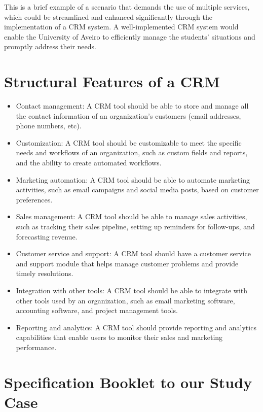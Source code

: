 \documentclass{article}
\begin{document}
This is a brief example of a scenario that demands the use of multiple services, which could be streamlined and enhanced significantly through the implementation of a CRM system. A well-implemented CRM system would enable the University of Aveiro to efficiently manage the students' situations and promptly address their needs.


\section{Structural Features of a CRM}

\begin{itemize}
    \item Contact management: A CRM tool should be able to store and manage all the contact information of an organization's customers (email addresses, phone numbers, etc).

    \item Customization: A CRM tool should be customizable to meet the specific needs and workflows of an organization, such as custom fields and reports, and the ability to create automated workflows.

    \item Marketing automation: A CRM tool should be able to automate marketing activities, such as email campaigns and social media posts, based on customer preferences.

    \item Sales management: A CRM tool should be able to manage sales activities, such as tracking their sales pipeline, setting up reminders for follow-ups, and forecasting revenue.

    \item Customer service and support: A CRM tool should have a customer service and support module that helps manage customer problems and provide timely resolutions.

    \item Integration with other tools: A CRM tool should be able to integrate with other tools used by an organization, such as email marketing software, accounting software, and project management tools.

    \item Reporting and analytics: A CRM tool should provide reporting and analytics capabilities that enable users to monitor their sales and marketing performance.
\end{itemize}


\section{Specification Booklet to our Study Case}
\end{document}
